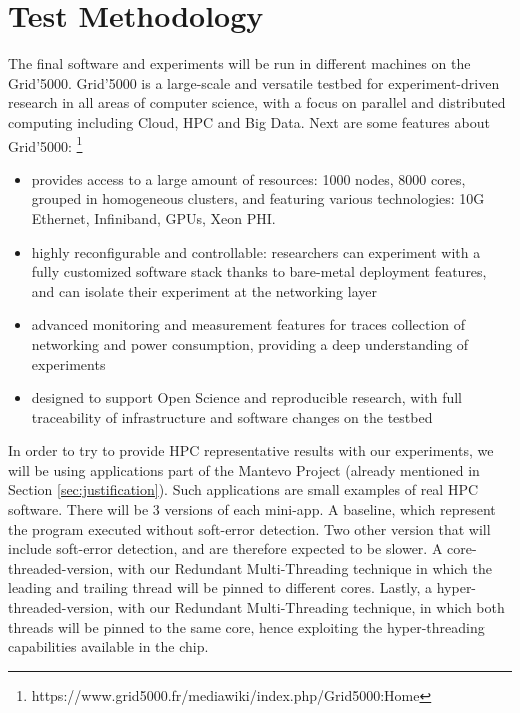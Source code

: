 
\section{Test Methodology}
\label{sec:testMethodology}
The final software and experiments will be run in different machines on the Grid'5000. Grid'5000 is a large-scale and versatile testbed for experiment-driven research in all areas of computer science, with a focus on parallel and distributed computing including Cloud, HPC and Big Data. Next are some features about Grid'5000: \footnote{https://www.grid5000.fr/mediawiki/index.php/Grid5000:Home}

\begin{itemize}
\item provides access to a large amount of resources: 1000 nodes, 8000 cores, grouped in homogeneous clusters, and featuring various technologies: 10G Ethernet, Infiniband, GPUs, Xeon PHI.
\item highly reconfigurable and controllable: researchers can experiment with a fully customized software stack thanks to bare-metal deployment features, and can isolate their experiment at the networking layer
\item advanced monitoring and measurement features for traces collection of networking and power consumption, providing a deep understanding of experiments
\item designed to support Open Science and reproducible research, with full traceability of infrastructure and software changes on the testbed
\end{itemize}

In order to try to provide HPC representative results with our experiments, we will be using applications part of the Mantevo Project (already mentioned in Section \ref{sec:justification}). Such applications are small examples of real HPC software. There will be 3 versions of each mini-app. A baseline, which represent the program executed without soft-error detection. Two other version that will include soft-error detection, and are therefore expected to be slower. A core-threaded-version, with our Redundant Multi-Threading technique in which the leading and trailing thread will be pinned to different cores. Lastly, a hyper-threaded-version, with our Redundant Multi-Threading technique, in which both threads will be pinned to the same core, hence exploiting the hyper-threading capabilities available in the chip. 

